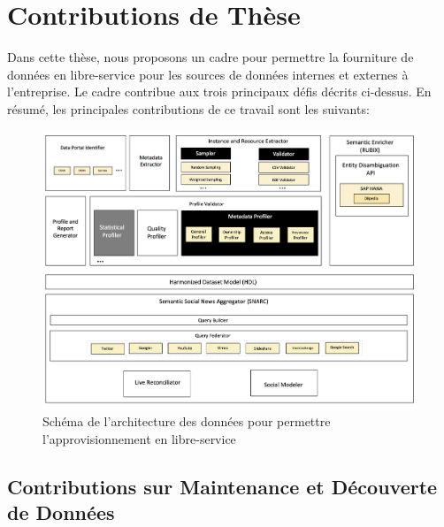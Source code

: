 \documentclass[a4paper,11pt,twoside]{ThesisStyle}
\begin{document}

\section{Contributions de Thèse} \label{section:contribution}

Dans cette thèse, nous proposons un cadre pour permettre la fourniture de données en libre-service pour les sources de données internes et externes à l'entreprise. Le cadre contribue aux trois principaux défis décrits ci-dessus. En résumé, les principales contributions de ce travail sont les suivants:

\begin{adjustwidth}{-.4in}{-.4in}
	\begin{figure}[!ht]
	  \centering
	  \includegraphics[scale=0.4]{figures/architecutre_diagram.png}
	  \caption{Schéma de l'architecture des données pour permettre l'approvisionnement en libre-service}
	  \label{fig:architecutre_diagram}
	\end{figure}
\end{adjustwidth}

\subsection{Contributions sur Maintenance et Découverte de Données}
\end{document}
